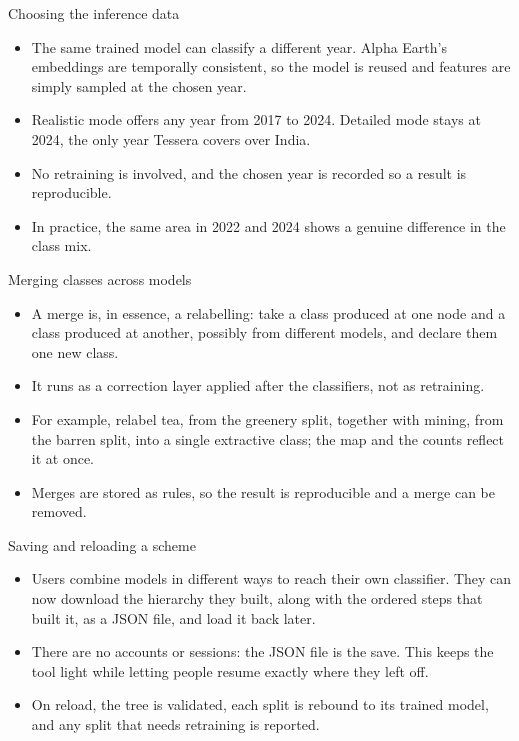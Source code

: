 \documentclass[aspectratio=169]{beamer}
\begin{document}
\begin{frame}{Choosing the inference data}
\begin{itemize}
  \item The same trained model can classify a different year. Alpha Earth's embeddings are
  temporally consistent, so the model is reused and features are simply sampled at the chosen
  year.
  \item Realistic mode offers any year from 2017 to 2024. Detailed mode stays at 2024, the only
  year Tessera covers over India.
  \item No retraining is involved, and the chosen year is recorded so a result is reproducible.
  \item In practice, the same area in 2022 and 2024 shows a genuine difference in the class mix.
\end{itemize}
\end{frame}

\begin{frame}{Merging classes across models}
\begin{itemize}
  \item A merge is, in essence, a relabelling: take a class produced at one node and a class
  produced at another, possibly from different models, and declare them one new class.
  \item It runs as a correction layer applied after the classifiers, not as retraining.
  \item For example, relabel tea, from the greenery split, together with mining, from the
  barren split, into a single extractive class; the map and the counts reflect it at once.
  \item Merges are stored as rules, so the result is reproducible and a merge can be removed.
\end{itemize}
\end{frame}

\begin{frame}{Saving and reloading a scheme}
\begin{itemize}
  \item Users combine models in different ways to reach their own classifier. They can now
  download the hierarchy they built, along with the ordered steps that built it, as a JSON
  file, and load it back later.
  \item There are no accounts or sessions: the JSON file is the save. This keeps the tool light
  while letting people resume exactly where they left off.
  \item On reload, the tree is validated, each split is rebound to its trained model, and any
  split that needs retraining is reported.
\end{itemize}
\end{frame}
\end{document}
